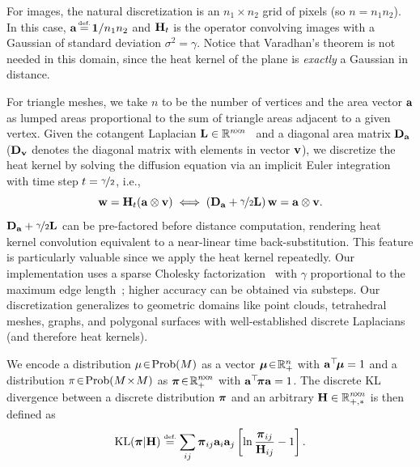 For images, the natural discretization is an $n_1\!\times\!n_2$ grid of pixels (so $n=n_1n_2$). In this case, $\a\!\eqdef\!\1/n_1n_2$ and $\mathbf{H}_t$ is the operator convolving images with a Gaussian of standard deviation $\sigma^2\!=\!\gamma$. Notice that Varadhan's theorem is not needed in this domain, since the heat kernel of the plane is \emph{exactly} a Gaussian in distance.

For triangle meshes, we take $n$ to be the number of vertices and the area vector $\mathbf a$ as lumped areas proportional to the sum of triangle areas adjacent to a given vertex. Given the cotangent Laplacian $\mathbf{L}\in\mathbb{R}^{n\!\times\!n}$~\cite{MacNeal:1949} and a diagonal area matrix $\mathbf{D}_{\mathbf a}$ ($\mathbf{D}_{\mathbf v}$ denotes the diagonal matrix with elements in vector $\mathbf v$), we discretize the heat kernel by solving the diffusion equation via an implicit Euler integration~\cite{Desbrun:1999} with time step $t=\nicefrac{\gamma}{2}$, i.e.,
\[
	\mathbf w = \mathbf{H}_t(\mathbf a\otimes\mathbf v) \iff \left(\mathbf{D}_{\mathbf a} + \nicefrac{\gamma}{2} \mathbf{L}\right)\mathbf w = \mathbf a\otimes\mathbf v.
\]
$\mathbf{D}_{\mathbf a} + \nicefrac{\gamma}{2} \mathbf{L}$ can be pre-factored before distance computation, rendering heat kernel convolution equivalent to a near-linear time back-substitution. This feature is particularly valuable since we apply the heat kernel repeatedly.  Our implementation uses a sparse Cholesky factorization~\cite{Davis:2006} with $\gamma$ proportional to the maximum edge length~\cite{crane-2013}; higher accuracy can be obtained via substeps.  Our discretization generalizes to geometric domains like point clouds, tetrahedral meshes, graphs, and polygonal surfaces with well-established discrete Laplacians (and therefore heat kernels). 



We encode a distribution $\mu\!\in\!\mathrm{Prob}(M)$ as a vector $\boldsymbol{\mu}\!\in\!\mathbb{R}_+^n$ with $\mathbf a^\top\!\boldsymbol{\mu}=1$ and a distribution $\pi\!\in\!\mathrm{Prob}(M\!\times\!M)$ as $\boldsymbol{\pi}\!\in\!\mathbb{R}_+^{n\!\times\!n}$ with $\mathbf a^\top\!\boldsymbol{\pi}\mathbf a=1$.  
The discrete KL divergence between a discrete distribution $\boldsymbol{\pi}$ and an arbitrary $\mathbf{H} \in \mathbb{R}_{+,*}^{n\!\times\!n}$ is then defined as
\begin{equation}
	\KL(\bpi|\kernelH) \eqdef \sum_{ij} 
		\bpi_{ij}\a_i \a_j\left[\ln\frac{\bpi_{ij}}{\kernelH_{ij}}-1\right] .
\end{equation}

